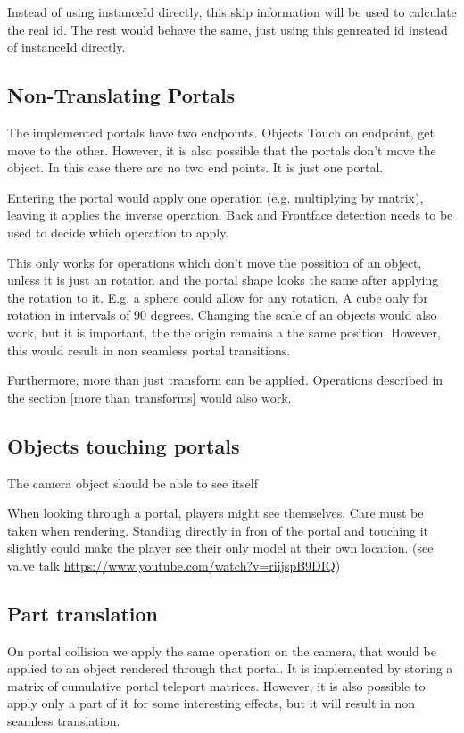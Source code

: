 Instead of using instanceId directly, this skip information will be used to calculate the real id. The rest would behave the same, just using this genreated id instead of instanceId directly.



\subsection{Non-Translating Portals}
The implemented portals have two endpoints. Objects Touch on endpoint, get move to the other. However, it is also possible that the portals don't move the object. In this case there are no two end points. It is just one portal.

Entering the portal would apply one operation (e.g. multiplying by matrix), leaving it applies the inverse operation. Back and Frontface detection needs to be used to decide which operation to apply.


This only works for operations which don't move the possition of an object, unless it is just an rotation and the portal shape looks the same after applying the rotation to it. E.g. a sphere could allow for any rotation. A cube only for rotation in intervals of 90 degrees.
Changing the scale of an objects would also work, but it is important, the the origin remains a the same position. However, this would result in non seamless portal transitions.

Furthermore, more than just transform can be applied. Operations described in the section \ref{more than transforms} would also work.

\subsection{Objects touching portals}

 The camera object should be able to see itself


When looking through a portal, players might see themselves. Care must be taken when rendering. Standing directly in fron of the portal and touching it slightly could make the player see their only model at their own location. (see valve talk \url{https://www.youtube.com/watch?v=riijspB9DIQ})
\subsection{Part translation}


On portal collision we apply the same operation on the camera, that would be applied to an object rendered through that portal.
It is implemented by storing a matrix of cumulative portal teleport matrices.
However, it is also possible to apply only a part of it for some interesting effects, but it will result in non seamless translation.

